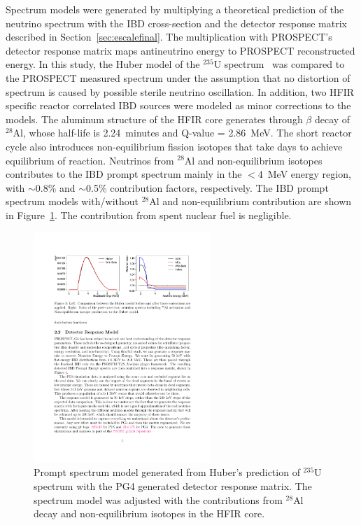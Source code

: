 Spectrum models were generated by multiplying a theoretical prediction of the neutrino spectrum with the IBD cross-section and the detector response matrix described in Section~\ref{sec:escalefinal}.
The multiplication with PROSPECT's detector response matrix maps antineutrino energy to PROSPECT reconstructed energy.
In this study, the Huber model of the $^{235}$U \nuebar spectrum~\cite{bib:huber} was compared to the PROSPECT measured spectrum under the assumption that no distortion of spectrum is caused by possible sterile neutrino oscillation.
In addition, two HFIR specific reactor correlated IBD sources were modeled as minor corrections to the models. 
The aluminum structure of the HFIR core generates \nuebar through $\beta$ decay of $^{28}$Al, whose half-life is 2.24~minutes and Q-value = 2.86~MeV. 
The short reactor cycle also introduces non-equilibrium fission isotopes that take days to achieve equilibrium of reaction.
Neutrinos from $^{28}$Al and non-equilibrium isotopes contributes to the IBD prompt spectrum mainly in the $<4$~MeV energy region, with $\sim$0.8\% and $\sim$0.5\% contribution factors, respectively.
The IBD prompt spectrum models with/without $^{28}$Al and non-equilibrium contribution are shown in Figure~\ref{fig:hubermodel}.
The contribution from spent nuclear fuel is negligible.
\begin{figure}[h!]
    \centering
    \includegraphics[width=0.6\textwidth]{Figures/HuberNoneq.pdf}
    \caption[Prompt spectrum model with Huber prediction]{
    Prompt spectrum model generated from Huber's prediction of $^{235}$U spectrum with the PG4 generated detector response matrix.
   	The spectrum model was adjusted with the contributions from $^{28}$Al decay and non-equilibrium isotopes in the HFIR core.}
    \label{fig:hubermodel}
\end{figure}

